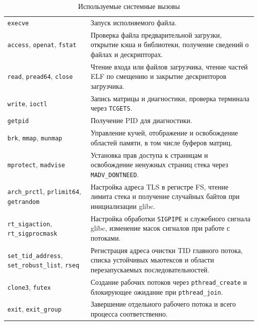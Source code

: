\documentclass[12pt,a4paper]{article}
\begin{document}
\begin{table}[H]
\caption{Используемые системные вызовы}
\small
\begin{tabularx}{\linewidth}{|P{5cm}|L|}\hline
{} &  \\ \hline
\texttt{execve} & Запуск исполняемого файла. \\ \hline
\texttt{access}, \texttt{openat}, \texttt{fstat} & Проверка файла предварительной загрузки, открытие кэша и библиотеки, получение сведений о файлах и дескрипторах. \\ \hline
\texttt{read}, \texttt{pread64}, \texttt{close} & Чтение входа или файлов загрузчика, чтение частей ELF по смещению и закрытие дескрипторов загрузчика. \\ \hline
\texttt{write}, \texttt{ioctl} & Запись матрицы и диагностики, проверка терминала через \texttt{TCGETS}. \\ \hline
\texttt{getpid} & Получение PID для диагностики. \\ \hline
\texttt{brk}, \texttt{mmap}, \texttt{munmap} & Управление кучей, отображение и освобождение областей памяти, в том числе буферов матриц. \\ \hline
\texttt{mprotect}, \texttt{madvise} & Установка прав доступа к страницам и освобождение ненужных страниц стека через \texttt{MADV\_DONTNEED}. \\ \hline
\texttt{arch\_prctl}, \texttt{prlimit64}, \texttt{getrandom} & Настройка адреса TLS в регистре FS, чтение лимита стека и получение случайных байтов при инициализации glibc. \\ \hline
\texttt{rt\_sigaction}, \texttt{rt\_sigprocmask} & Настройка обработки \texttt{SIGPIPE} и служебного сигнала glibc, изменение масок сигналов при работе с потоками. \\ \hline
\texttt{set\_tid\_address}, \texttt{set\_robust\_list}, \texttt{rseq} & Регистрация адреса очистки TID главного потока, списка устойчивых мьютексов и области перезапускаемых последовательностей. \\ \hline
\texttt{clone3}, \texttt{futex} & Создание рабочих потоков через \texttt{pthread\_create} и блокирующее ожидание при \texttt{pthread\_join}. \\ \hline
\texttt{exit}, \texttt{exit\_group} & Завершение отдельного рабочего потока и всего процесса соответственно. \\ \hline
\end{tabularx}
\end{table}
\end{document}

